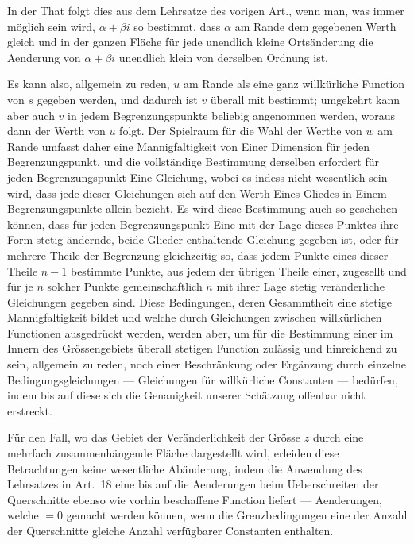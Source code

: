 \documentclass[12pt,a4paper]{article}
\begin{document}
In der That folgt dies aus dem Lehrsatze des vorigen Art., wenn man, was immer möglich sein wird, $\alpha + \beta i$ so bestimmt, dass $\alpha$ am Rande dem gegebenen Werth gleich und in der ganzen Fläche für jede unendlich kleine Ortsänderung die Aenderung von $\alpha + \beta i$ unendlich klein von derselben Ordnung ist.

Es kann also, allgemein zu reden, $u$ am Rande als eine ganz willkürliche Function von $s$ gegeben werden, und dadurch ist $v$ überall mit bestimmt; umgekehrt kann aber auch $v$ in jedem Begrenzungspunkte beliebig angenommen werden, woraus dann der Werth von $u$ folgt. Der Spielraum für die Wahl der Werthe von $w$ am Rande umfasst daher eine Mannigfaltigkeit von Einer Dimension für jeden Begrenzungspunkt, und die vollständige Bestimmung derselben erfordert für jeden Begrenzungspunkt Eine Gleichung, wobei es indess nicht wesentlich sein wird, dass jede dieser Gleichungen sich auf den Werth Eines Gliedes in Einem Begrenzungspunkte allein bezieht. Es wird diese Bestimmung auch so geschehen können, dass für jeden Begrenzungspunkt Eine mit der Lage dieses Punktes ihre Form stetig ändernde, beide Glieder enthaltende Gleichung gegeben ist, oder für mehrere Theile der Begrenzung gleichzeitig so, dass jedem Punkte eines dieser Theile $n - 1$ bestimmte Punkte, aus jedem der übrigen Theile einer, zugesellt und für je $n$ solcher Punkte gemeinschaftlich $n$ mit ihrer Lage stetig veränderliche Gleichungen gegeben sind. Diese Bedingungen, deren Gesammtheit eine stetige Mannigfaltigkeit bildet und welche durch Gleichungen zwischen willkürlichen Functionen ausgedrückt werden, werden aber, um für die Bestimmung einer im Innern des Grössengebiets überall stetigen Function zulässig und hinreichend zu sein, allgemein zu reden, noch einer Beschränkung oder Ergänzung durch einzelne Bedingungsgleichungen --- Gleichungen für willkürliche Constanten --- bedürfen, indem bis auf diese sich die Genauigkeit unserer Schätzung offenbar nicht erstreckt.

Für den Fall, wo das Gebiet der Veränderlichkeit der Grösse $z$ durch eine mehrfach zusammenhängende Fläche dargestellt wird, erleiden diese Betrachtungen keine wesentliche Abänderung, indem die Anwendung des Lehrsatzes in Art.~18 eine bis auf die Aenderungen beim Ueberschreiten der Querschnitte ebenso wie vorhin beschaffene Function liefert --- Aenderungen, welche ${}= 0$ gemacht werden können, wenn die Grenzbedingungen eine der Anzahl der Querschnitte gleiche Anzahl verfügbarer Constanten enthalten.
\end{document}
